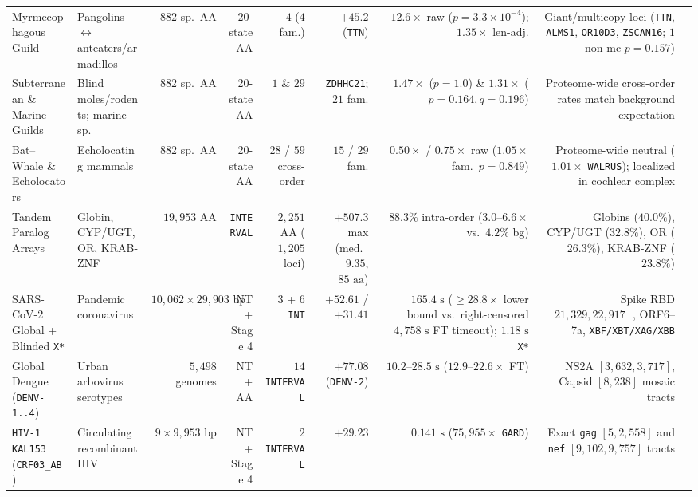 \documentclass[12pt]{article}
\begin{document}
\begin{table}[H]
{\begin{tabular}{@{}llrrrrrrl@{}}
Myrmecophagous Guild & Pangolins $\leftrightarrow$ anteaters/armadillos & $882$ sp.\ AA & 20-state AA & $4$ ($4$ fam.) & $+45.2$ (\texttt{TTN}) & $12.6\times$ raw ($p=3.3\times 10^{-4}$); $1.35\times$ len-adj. & Giant/multicopy loci (\texttt{TTN}, \texttt{ALMS1}, \texttt{OR10D3}, \texttt{ZSCAN16}; $1$ non-mc $p=0.157$) & \\
Subterranean \& Marine Guilds & Blind moles/rodents; marine sp. & $882$ sp.\ AA & 20-state AA & $1$ \& $29$ & \texttt{ZDHHC21}; $21$ fam. & $1.47\times$ ($p=1.0$) \& $1.31\times$ ($p=0.164, q=0.196$) & Proteome-wide cross-order rates match background expectation & \\
Bat--Whale \& Echolocators & Echolocating mammals & $882$ sp.\ AA & 20-state AA & $28$ / $59$ cross-order & $15$ / $29$ fam. & $0.50\times$ / $0.75\times$ raw ($1.05\times$ fam.\ $p=0.849$) & Proteome-wide neutral ($1.01\times$ \texttt{WALRUS}); localized in cochlear complex & \\
Tandem Paralog Arrays & Globin, CYP/UGT, OR, KRAB-ZNF & $19,953$ AA & \texttt{INTERVAL} & $2,251$ AA ($1,205$ loci) & $+507.3$ max (med.\ $9.35$, $85\text{ aa}$) & $88.3\%$ intra-order ($3.0\text{--}6.6\times$ vs.\ $4.2\%$ bg) & Globins ($40.0\%$), CYP/UGT ($32.8\%$), OR ($26.3\%$), KRAB-ZNF ($23.8\%$) & \\
SARS-CoV-2 Global + Blinded \texttt{X*} & Pandemic coronavirus & $10,062 \times 29{,}903\text{ bp}$ & NT + Stage 4 & $3$ + $6$ \texttt{INT} & $+52.61$ / $+31.41$ & $165.4\text{ s}$ ($\ge 28.8\times$ lower bound vs.\ right-censored $4{,}758\text{ s}$ FT timeout); $1.18\text{ s}$ \texttt{X*} & Spike RBD $[21{,}329,22{,}917]$, ORF6--7a, \texttt{XBF/XBT/XAG/XBB} & \\
Global Dengue (\texttt{DENV-1..4}) & Urban arbovirus serotypes & $5,498$ genomes & NT + AA & $14$ \texttt{INTERVAL} & $+77.08$ (\texttt{DENV-2}) & $10.2\text{--}28.5\text{ s}$ ($12.9\text{--}22.6\times$ FT) & NS2A $[3{,}632,3{,}717]$, Capsid $[8,238]$ mosaic tracts & \\
\texttt{HIV-1 KAL153} (\texttt{CRF03\_AB}) & Circulating recombinant HIV & $9 \times 9{,}953\text{ bp}$ & NT + Stage 4 & $2$ \texttt{INTERVAL} & $+29.23$ & $0.141\text{ s}$ ($75,955\times$ \texttt{GARD}) & Exact \texttt{gag} $[5,2{,}558]$ and \texttt{nef} $[9{,}102,9{,}757]$ tracts & \\
\bottomrule
\end{tabular}%
}
\end{table}
\end{document}
